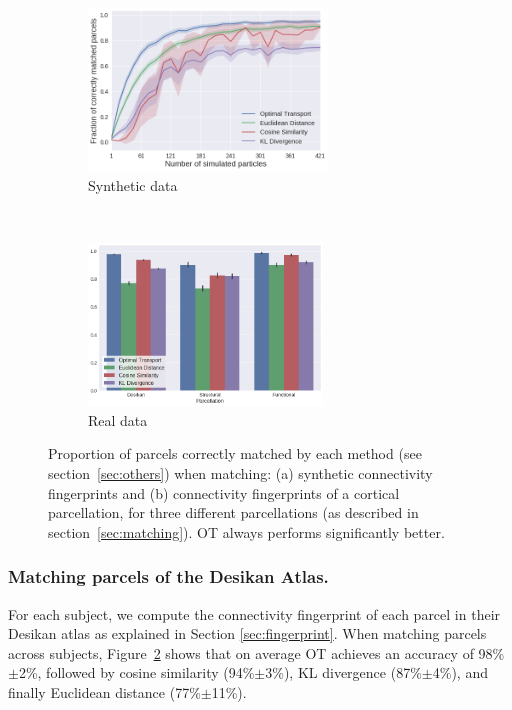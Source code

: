 
\begin{figure}[t!]
    \centering
    \begin{subfigure}[t]{0.52\textwidth}
        \centering
        \includegraphics[height=1.7in]{3.matching/images/synthetic}
        \caption{{\scriptsize Synthetic data}}
        \label{fig:synth}
    \end{subfigure}%
    ~ 
    \begin{subfigure}[t]{0.52\textwidth}
        \centering
        \includegraphics[height=1.7in]{3.matching/images/real}
        \caption{{\scriptsize Real data}}
        \label{fig:real}
    \end{subfigure}
    \caption{Proportion of parcels correctly matched by each method (see section~\ref{sec:others}) when matching: (a) synthetic connectivity fingerprints and (b) connectivity fingerprints of a cortical parcellation, for three different parcellations (as described in section~\ref{sec:matching}). OT always performs significantly better.}
    \label{fig:results}
\end{figure}

\subsubsection{Matching parcels of the Desikan Atlas.}
For each subject, we compute the connectivity fingerprint of each parcel in their Desikan atlas as explained in Section \ref{sec:fingerprint}. When matching parcels across subjects, Figure~\ref{fig:real} shows that on average OT achieves an accuracy of 98\%$\pm$2\%, followed by cosine similarity (94\%$\pm$3\%), KL divergence (87\%$\pm$4\%), and finally Euclidean distance (77\%$\pm$11\%).

